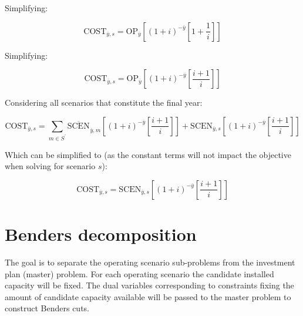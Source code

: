 \documentclass{article}
\newcommand{\sScenarios}{S}
\newcommand{\iYear}{y}
\newcommand{\iYearTerminal}{\overline{\iYear}}
\newcommand{\iScenario}{s}
\newcommand{\iScenarioAlias}{m}
\newcommand{\cOperatingCost}[1][\iYear,\iScenario]{\mathrm{OP}_{#1}}
\newcommand{\cInterestRate}{i}
\newcommand{\cObjectiveFunction}{\mathrm{COST}}
\newcommand{\cOperatingCostScenario}[1][\iYear,\iScenario]{\mathrm{SCEN}_{#1}}
\begin{document}
Simplifying:

\begin{equation}
	\cObjectiveFunction_{\iYearTerminal,\iScenario} = \cOperatingCost[\iYearTerminal] \left[(1+\cInterestRate)^{-\iYearTerminal} \left[1 + \frac{1}{\cInterestRate}\right]\right]
\end{equation}

Simplifying:

\begin{equation}
	\cObjectiveFunction_{\iYearTerminal,\iScenario} = \cOperatingCost[\iYearTerminal] \left[(1+\cInterestRate)^{-\iYearTerminal} \left[ \frac{\cInterestRate + 1}{\cInterestRate}\right]\right]
\end{equation}

Considering all scenarios that constitute the final year:

\begin{equation}
	\cObjectiveFunction_{\iYearTerminal,\iScenario} = \sum\limits_{\iScenarioAlias \in \sScenarios^{\prime}} \overline{\cOperatingCostScenario[]}_{\iYearTerminal,\iScenarioAlias} \left[(1+\cInterestRate)^{-\iYearTerminal} \left[\frac{\cInterestRate + 1}{\cInterestRate}\right]\right] + \cOperatingCostScenario[\iYearTerminal,\iScenario] \left[(1+\cInterestRate)^{-\iYearTerminal} \left[\frac{\cInterestRate + 1}{\cInterestRate}\right]\right] 
\end{equation}

Which can be simplified to (as the constant terms will not impact the objective when solving for scenario $\iScenario$):

\begin{equation}
\cObjectiveFunction_{\iYearTerminal,\iScenario} = \cOperatingCostScenario[\iYearTerminal,\iScenario] \left[(1+\cInterestRate)^{-\iYearTerminal} \left[\frac{\cInterestRate + 1}{\cInterestRate}\right]\right] 
\end{equation}



\section{Benders decomposition}
The goal is to separate the operating scenario sub-problems from the investment plan (master) problem. For each operating scenario the candidate installed capacity will be fixed. The dual variables corresponding to constraints fixing the amount of candidate capacity available will be passed to the master problem to construct Benders cuts.
\end{document}
